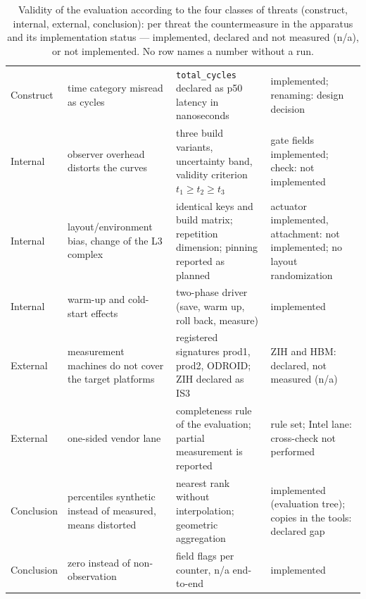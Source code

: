 \begin{nurkurz}
\begin{table}[htbp]
\begin{tabular}{@{}>{\raggedright\arraybackslash}p{1.6cm}>{\raggedright\arraybackslash}p{4.0cm}>{\raggedright\arraybackslash}p{4.9cm}>{\raggedright\arraybackslash}p{3.7cm}@{}}
Construct & time category misread as cycles & \texttt{total\_cycles} declared as p50 latency in nanoseconds & implemented; renaming: design decision \\
Internal & observer overhead distorts the curves & three build variants, uncertainty band, validity criterion $t_1 \ge t_2 \ge t_3$ & gate fields implemented; check: not implemented \\
Internal & layout/environment bias, change of the L3 complex & identical keys and build matrix; repetition dimension; pinning reported as planned & actuator implemented, attachment: not implemented; no layout randomization \\
Internal & warm-up and cold-start effects & two-phase driver (save, warm up, roll back, measure) & implemented \\
External & measurement machines do not cover the target platforms & registered signatures prod1, prod2, ODROID\@; ZIH declared as IS3 & ZIH and HBM\@: declared, not measured (n/a) \\
External & one-sided vendor lane & completeness rule of the evaluation; partial measurement is reported & rule set; Intel lane: cross-check not performed \\
Conclusion & percentiles synthetic instead of measured, means distorted & nearest rank without interpolation; geometric aggregation & implemented (evaluation tree); copies in the tools: declared gap \\
Conclusion & zero instead of non-observation & field flags per counter, n/a end-to-end & implemented \\
\bottomrule
\end{tabular}
\caption{Validity of the evaluation according to the four classes of threats (construct, internal,
external, conclusion): per threat the countermeasure in the apparatus and its implementation status
--- implemented, declared and not measured (n/a), or not implemented. No row names a number without
a run.}\label{tab:eval-gueltigkeit}
\end{table}
\end{nurkurz}

